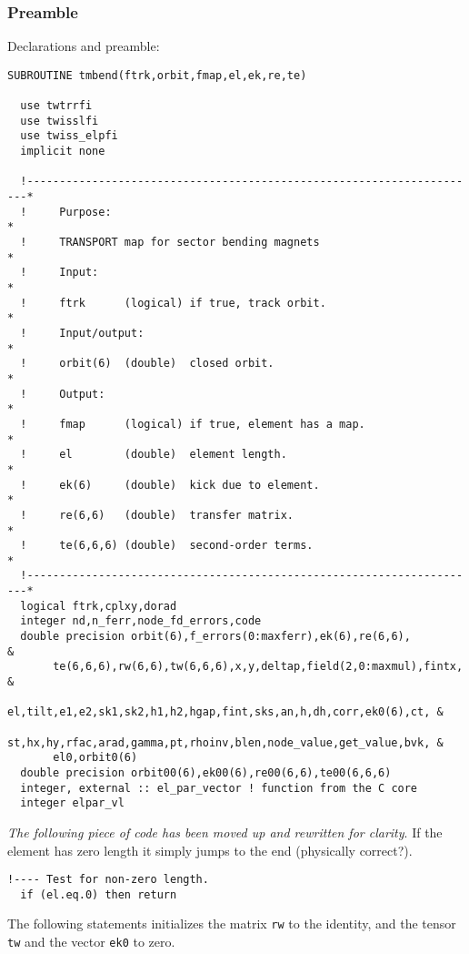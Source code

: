 \documentclass{cern-art} %
\renewcommand{\L}[1]{\lstinline[firstnumber=last]{#1}}
\begin{document}
\subsubsection{Preamble}
Declarations and preamble:
\begin{lstlisting}[firstnumber=auto]
SUBROUTINE tmbend(ftrk,orbit,fmap,el,ek,re,te)

  use twtrrfi
  use twisslfi
  use twiss_elpfi
  implicit none

  !----------------------------------------------------------------------*
  !     Purpose:                                                         *
  !     TRANSPORT map for sector bending magnets                         *
  !     Input:                                                           *
  !     ftrk      (logical) if true, track orbit.                        *
  !     Input/output:                                                    *
  !     orbit(6)  (double)  closed orbit.                                *
  !     Output:                                                          *
  !     fmap      (logical) if true, element has a map.                  *
  !     el        (double)  element length.                              *
  !     ek(6)     (double)  kick due to element.                         *
  !     re(6,6)   (double)  transfer matrix.                             *
  !     te(6,6,6) (double)  second-order terms.                          *
  !----------------------------------------------------------------------*
  logical ftrk,cplxy,dorad
  integer nd,n_ferr,node_fd_errors,code
  double precision orbit(6),f_errors(0:maxferr),ek(6),re(6,6),           &
       te(6,6,6),rw(6,6),tw(6,6,6),x,y,deltap,field(2,0:maxmul),fintx,   &
       el,tilt,e1,e2,sk1,sk2,h1,h2,hgap,fint,sks,an,h,dh,corr,ek0(6),ct, &
       st,hx,hy,rfac,arad,gamma,pt,rhoinv,blen,node_value,get_value,bvk, &
       el0,orbit0(6)
  double precision orbit00(6),ek00(6),re00(6,6),te00(6,6,6)
  integer, external :: el_par_vector ! function from the C core
  integer elpar_vl
\end{lstlisting}
{\em The following piece of code has been moved up and rewritten for clarity}. If the element has zero length it simply jumps to the end (physically correct?).
\begin{lstlisting}[firstnumber=last]
  !---- Test for non-zero length.
  if (el.eq.0) then return
\end{lstlisting}
The following statements initializes the matrix \L{rw} to the identity, and the tensor \L{tw} and the vector \L{ek0} to zero.
\end{document}
